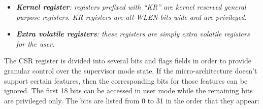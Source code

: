 \begin{itemize}
                \item \textit{\textbf{Kernel register}: registers prefixed with ``KR'' are kernel reserved general purpose registers. KR registers are all WLEN bits wide and are privileged.}

                \item \textit{\textbf{Extra volatile registers}: these registers are simply extra volatile registers for the user.}

            \end{itemize}

            The CSR register is divided into several bits and flags fields in order to provide granular control over the supervisor mode state. If the micro-architecture doesn't support certain features, then the corresponding bits for those features can be ignored. The first 18 bits can be accessed in user mode while the remaining bits are privileged only. The bits are listed from 0 to 31 in the order that they appear:

